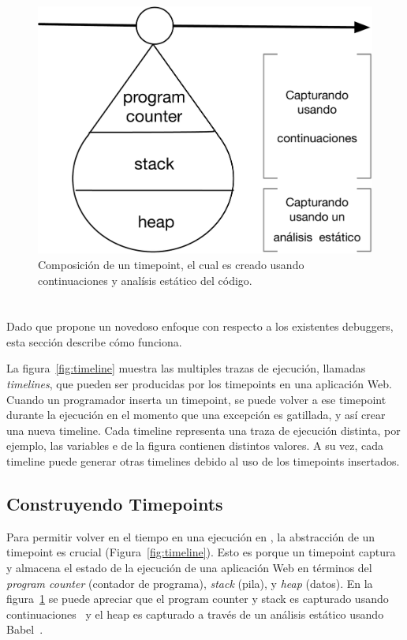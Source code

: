 \documentclass[conference]{IEEEtran}
\begin{document}
\begin{figure}[t]
\begin{center}
\includegraphics[width=.55\linewidth]{fig-timepoint}
\caption{Composici\'on de un timepoint, el cual es creado usando continuaciones y anal\'isis est\'atico del c\'odigo.}
\label{fig:timepoint}
\end{center}
\end{figure}


\section{\deloreanjs}
\label{sec:deloreanjs}

Dado que \deloreanjs propone un novedoso enfoque con respecto a los existentes debuggers, esta secci\'on describe c\'omo funciona. 

\smallskip

La figura~\ref{fig:timeline} muestra las multiples trazas de ejecuci\'on, llamadas {\em timelines}, que pueden ser producidas por los timepoints en una aplicaci\'on Web. Cuando un programador inserta un timepoint, se puede volver a ese timepoint durante la ejecuci\'on en el momento que una excepci\'on es gatillada, y as\'i crear una nueva timeline. Cada timeline representa una traza de ejecuci\'on distinta, por ejemplo, las variables  e  de la figura contienen distintos valores. A su vez, cada timeline puede generar otras timelines debido al uso de los timepoints insertados. 

\subsection{Construyendo Timepoints}
\label{sec:ctime}



Para permitir volver en el tiempo en una ejecuci\'on en \deloreanjs, la abstracci\'on de un timepoint es crucial (Figura~\ref{fig:timeline}). Esto es porque un timepoint captura y almacena el estado de la ejecuci\'on de una aplicaci\'on Web en t\'erminos del {\em program counter} (contador de programa), {\em stack} (pila), y {\em heap} (datos). En la figura~\ref{fig:timepoint} se puede apreciar que el program counter y stack es capturado usando continuaciones~\cite{fw84} y el heap es capturado a trav\'es de un an\'alisis est\'atico usando Babel~\cite{mckenzie:babel}.        
  
\end{document}
